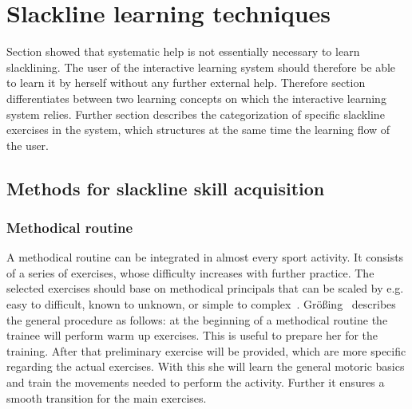 \section{Slackline learning techniques}\label{3_3_learningTechniques}
Section \textit{} showed that systematic help is not essentially necessary to learn slacklining. The user of the interactive learning system should therefore be able to learn it by herself without any further external help. Therefore section \textit{} differentiates between two learning concepts on which the interactive learning system relies.
Further section \textit{} describes the categorization of specific slackline exercises in the system, which structures at the same time the learning flow of the user.

\subsection{Methods for slackline skill acquisition}\label{3_3_1_learningConcepts}
\subsubsection{Methodical routine}
A methodical routine can be integrated in almost every sport activity. It consists of a series of exercises, whose difficulty increases with further practice. The selected exercises should base on methodical principals that can be scaled by e.g. easy to difficult, known to unknown, or simple to complex~\cite{Fetz1996-ml}. Größing~\cite{Groessing1997-sp} describes the general procedure as follows: at the beginning of a methodical routine the trainee will perform warm up exercises. This is useful to prepare her for the training. After that preliminary exercise will be provided, which are more specific regarding the actual exercises. With this she will learn the general motoric basics and train the movements needed to perform the activity. Further it ensures a smooth transition for the main exercises.

